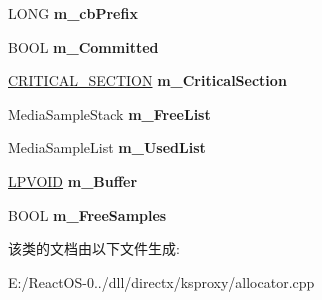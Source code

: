 \begin{DoxyCompactItemize}
L\+O\+NG {\bfseries m\+\_\+cb\+Prefix}
\item 
\mbox{\label{class_c_ks_allocator_a501be8bc217f7443e9ee84f668179c0e}} 
B\+O\+OL {\bfseries m\+\_\+\+Committed}
\item 
\mbox{\label{class_c_ks_allocator_a0daa50dbc46ebe38953040f31a065d17}} 
\hyperlink{struct___c_r_i_t_i_c_a_l___s_e_c_t_i_o_n}{C\+R\+I\+T\+I\+C\+A\+L\+\_\+\+S\+E\+C\+T\+I\+ON} {\bfseries m\+\_\+\+Critical\+Section}
\item 
\mbox{\label{class_c_ks_allocator_a136e73cdc2b6f965e5464a6eb62771a5}} 
Media\+Sample\+Stack {\bfseries m\+\_\+\+Free\+List}
\item 
\mbox{\label{class_c_ks_allocator_a314b3aafd88e753ed2f399b4623ad5ca}} 
Media\+Sample\+List {\bfseries m\+\_\+\+Used\+List}
\item 
\mbox{\label{class_c_ks_allocator_a454a0dfd509bf6260c90287c9467b668}} 
\hyperlink{interfacevoid}{L\+P\+V\+O\+ID} {\bfseries m\+\_\+\+Buffer}
\item 
\mbox{\label{class_c_ks_allocator_abd388660c3962af395e42f4dc4d4fb81}} 
B\+O\+OL {\bfseries m\+\_\+\+Free\+Samples}
\end{DoxyCompactItemize}


该类的文档由以下文件生成\+:\begin{DoxyCompactItemize}
\item 
E\+:/\+React\+O\+S-\/0../dll/directx/ksproxy/allocator.\+cpp\end{DoxyCompactItemize}
